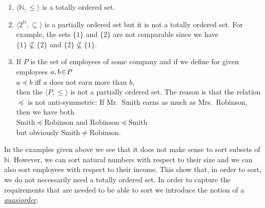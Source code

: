 \examples
\begin{enumerate}
\item $\langle\mathbb{N}, \leq \rangle$ is a totally ordered set.
\item $\langle 2^{\mathbb{N}}, \subseteq \rangle$ is a partially ordered set but it is not a totally
      ordered set.  For example, the sets $\{1\}$ and $\{2\}$ are not comparable since we have
      \\[0.2cm]
      \hspace*{1.3cm}
      $\{1\} \not\subseteq \{2\}$ \quad and \quad  $\{2\} \not\subseteq \{1\}$.
\item If $P$ is the set of employees of some company and if we define for given employees
      $a,b \!\in\! P$
      \\[0.2cm]
      \hspace*{1.3cm}
      $a \preceq b$ \quad iff \quad  $a$ does not earn more than $b$, 
      \\[0.2cm]
      then the $\langle P, \leq \rangle$ is not a partially ordered set.  The reason is that
      the relation $\preceq$ is not anti-symmetric:  If Mr.~Smith earns as much as
      Mrs.~Robinson, then we have both
      \\[0.2cm]
      \hspace*{1.3cm}
      $\mathrm{Smith} \preceq \mathrm{Robinson}$ \quad and \quad $\mathrm{Robinson} \preceq \mathrm{Smith}$
      \\[0.2cm]
      but obviously $\mathrm{Smith} \not= \mathrm{Robinson}$.
\end{enumerate}
In the examples given above we see that it does not make sense to sort subsets of $\mathbb{N}$.
However, we can sort natural numbers with respect to their size and we can also sort employees with
respect to their income.  This show that, in order to sort,  we do not necessarily need a totally
ordered set.  In order to capture the requirements that are needed to be able to sort we introduce
the notion of a \href{http://en.wikipedia.org/wiki/Preorder}{\emph{quasiorder}}.


